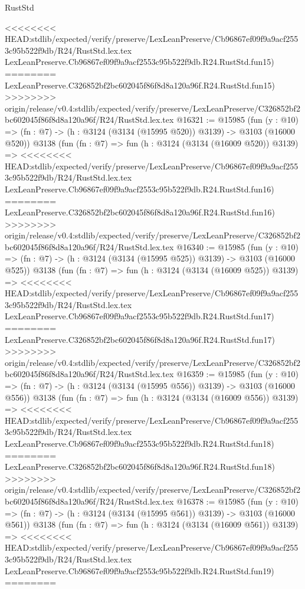 \begin{lexlean}{RustStd}
\begin{coremodule}
{\begin{coremodule}
{{{{{{{{{{{{{{{{{{{{{{{{{{<<<<<<<< HEAD:stdlib/expected/verify/preserve/LexLeanPreserve/Cb96867ef09f9a9acf2553c95b522f9db/R24/RustStd.lex.tex
    LexLeanPreserve.Cb96867ef09f9a9acf2553c95b522f9db.R24.RustStd.fun15)
========
    LexLeanPreserve.C326852bf2bc602045f86f8d8a120a96f.R24.RustStd.fun15)
>>>>>>>> origin/release/v0.4:stdlib/expected/verify/preserve/LexLeanPreserve/C326852bf2bc602045f86f8d8a120a96f/R24/RustStd.lex.tex
@16321 := @15985
    (fun (y : @10) => (fn : @7) -> (h : @3124 (@3134 (@15995 @520)) @3139) -> @3103 (@16000 @520))
    @3138
    (fun (fn : @7) =>
    fun (h : @3124 (@3134 (@16009 @520)) @3139) =>
<<<<<<<< HEAD:stdlib/expected/verify/preserve/LexLeanPreserve/Cb96867ef09f9a9acf2553c95b522f9db/R24/RustStd.lex.tex
    LexLeanPreserve.Cb96867ef09f9a9acf2553c95b522f9db.R24.RustStd.fun16)
========
    LexLeanPreserve.C326852bf2bc602045f86f8d8a120a96f.R24.RustStd.fun16)
>>>>>>>> origin/release/v0.4:stdlib/expected/verify/preserve/LexLeanPreserve/C326852bf2bc602045f86f8d8a120a96f/R24/RustStd.lex.tex
@16340 := @15985
    (fun (y : @10) => (fn : @7) -> (h : @3124 (@3134 (@15995 @525)) @3139) -> @3103 (@16000 @525))
    @3138
    (fun (fn : @7) =>
    fun (h : @3124 (@3134 (@16009 @525)) @3139) =>
<<<<<<<< HEAD:stdlib/expected/verify/preserve/LexLeanPreserve/Cb96867ef09f9a9acf2553c95b522f9db/R24/RustStd.lex.tex
    LexLeanPreserve.Cb96867ef09f9a9acf2553c95b522f9db.R24.RustStd.fun17)
========
    LexLeanPreserve.C326852bf2bc602045f86f8d8a120a96f.R24.RustStd.fun17)
>>>>>>>> origin/release/v0.4:stdlib/expected/verify/preserve/LexLeanPreserve/C326852bf2bc602045f86f8d8a120a96f/R24/RustStd.lex.tex
@16359 := @15985
    (fun (y : @10) => (fn : @7) -> (h : @3124 (@3134 (@15995 @556)) @3139) -> @3103 (@16000 @556))
    @3138
    (fun (fn : @7) =>
    fun (h : @3124 (@3134 (@16009 @556)) @3139) =>
<<<<<<<< HEAD:stdlib/expected/verify/preserve/LexLeanPreserve/Cb96867ef09f9a9acf2553c95b522f9db/R24/RustStd.lex.tex
    LexLeanPreserve.Cb96867ef09f9a9acf2553c95b522f9db.R24.RustStd.fun18)
========
    LexLeanPreserve.C326852bf2bc602045f86f8d8a120a96f.R24.RustStd.fun18)
>>>>>>>> origin/release/v0.4:stdlib/expected/verify/preserve/LexLeanPreserve/C326852bf2bc602045f86f8d8a120a96f/R24/RustStd.lex.tex
@16378 := @15985
    (fun (y : @10) => (fn : @7) -> (h : @3124 (@3134 (@15995 @561)) @3139) -> @3103 (@16000 @561))
    @3138
    (fun (fn : @7) =>
    fun (h : @3124 (@3134 (@16009 @561)) @3139) =>
<<<<<<<< HEAD:stdlib/expected/verify/preserve/LexLeanPreserve/Cb96867ef09f9a9acf2553c95b522f9db/R24/RustStd.lex.tex
    LexLeanPreserve.Cb96867ef09f9a9acf2553c95b522f9db.R24.RustStd.fun19)
========
}}}}}}}}}}}}}}}}}}}}}}}}}}
\end{coremodule}}
\end{coremodule}
\end{lexlean}
